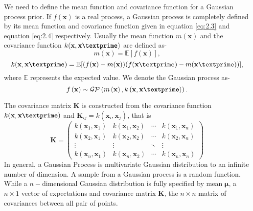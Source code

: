 We need to define the mean function and covariance function for a Gaussian process prior. If $f(\textbf{x})$ is a real process, a Gaussian process is completely defined by its mean function and covariance function given in equation \ref{eq:2.3} and equation \ref{eq:2.4} respectively. Usually the mean function $m(\textbf{x})$  and the covariance function $k(\textbf{x},\textbf{x\textprime})$ are defined as-
\begin{equation} \label{eq:2.3}
m(\textbf{x})= \mathbb{E}[f(\textbf{x})],
\end{equation}
\begin{equation} \label{eq:2.4}
k(\textbf{x},\textbf{x\textprime})= 
\mathbb{E}[(f(\textbf{x})-m(\textbf{x}))(f(\textbf{x}\textprime)-m(\textbf{x}\textprime))],
\end{equation}
where $\mathbb{E}$ represents the expected value. We denote the Gaussian process as-
\begin{equation} \label{eq:GP}
f\left(\textbf{x} \right)\sim \mathcal{GP} \left(m \left(\textbf{x}\right), k \left(\textbf{x},\textbf{x\textprime}\right) \right).
\end{equation}

The covariance matrix $\textbf{K}$ is constructed from the covariance function $k(\textbf{x},\textbf{x\textprime})$ and $\textbf{K}_{ij}=k\left(\textbf{x}_i,\textbf{x}_j\right)$, that is 
\begin{equation} \label{eq:GP_cov_mat}
\textbf{K} = 
 \begin{pmatrix}
  k\left(\textbf{x}_1,\textbf{x}_1\right) & k\left(\textbf{x}_1,\textbf{x}_2\right) & \cdots & k\left(\textbf{x}_1,\textbf{x}_n\right) \\
  k\left(\textbf{x}_2,\textbf{x}_1\right) & k\left(\textbf{x}_2,\textbf{x}_2\right) & \cdots & k\left(\textbf{x}_2,\textbf{x}_n\right) \\
  \vdots  & \vdots  & \ddots & \vdots  \\
  k\left(\textbf{x}_n,\textbf{x}_1\right) & k\left(\textbf{x}_n,\textbf{x}_2\right) & \cdots & k\left(\textbf{x}_n,\textbf{x}_n\right)
 \end{pmatrix}
\end{equation}
In general, a Gaussian Process is multivariate Gaussian distribution to an infinite number of dimension. A sample from a Gaussian process is a random function. While a $n-$dimensional Gaussian distribution is fully specified by mean $\boldsymbol\mu$, a $n \times 1$ vector of expectations and covariance matrix $\textbf{K}$, the $n \times n$ matrix of covariances between all pair of points.

